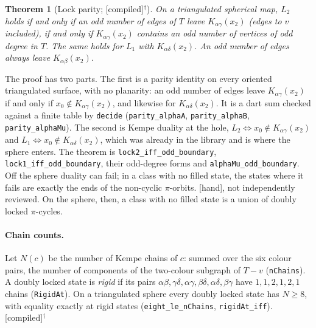 \documentclass[11pt]{article}
\newtheorem{theorem}{Theorem}\newtheorem{lemma}{Lemma}\newtheorem{conjecture}{Conjecture}
\newcommand{\lab}[1]{\textsf{[#1]}}
\begin{document}
\begin{theorem}[Lock parity; \lab{compiled}$^\dagger$]\label{thm:LP}
On a triangulated spherical map, $L_2$ holds if and only if an odd number of edges of $T$ leave $K_{\alpha\gamma}(x_2)$ (edges to $v$ included), if and only if $K_{\alpha\gamma}(x_2)$ contains an odd number of vertices of odd degree in $T$. The same holds for $L_1$ with $K_{\alpha\delta}(x_2)$. An odd number of edges always leave $K_{\alpha\beta}(x_2)$.
\end{theorem}
The proof has two parts. The first is a parity identity on every oriented triangulated surface, with no planarity: an odd number of edges leave $K_{\alpha\gamma}(x_2)$ if and only if $x_0\notin K_{\alpha\gamma}(x_2)$, and likewise for $K_{\alpha\delta}(x_2)$. It is a dart sum checked against a finite table by \texttt{decide} (\texttt{parity\_alphaA}, \texttt{parity\_alphaB}, \texttt{parity\_alphaMu}). The second is Kempe duality at the hole, $L_2\Leftrightarrow x_0\notin K_{\alpha\gamma}(x_2)$ and $L_1\Leftrightarrow x_0\notin K_{\alpha\delta}(x_2)$, which was already in the library and is where the sphere enters. The theorem is \texttt{lock2\_iff\_odd\_boundary}, \texttt{lock1\_iff\_odd\_boundary}, their odd-degree forms and \texttt{alphaMu\_odd\_boundary}. Off the sphere duality can fail; in a class with no filled state, the states where it fails are exactly the ends of the non-cyclic $\pi$-orbits. \lab{hand}, not independently reviewed. On the sphere, then, a class with no filled state is a union of doubly locked $\pi$-cycles.

\paragraph{Chain counts.} Let $N(c)$ be the number of Kempe chains of $c$: summed over the six colour pairs, the number of components of the two-colour subgraph of $T-v$ (\texttt{nChains}). A doubly locked state is \emph{rigid} if its pairs $\alpha\beta,\gamma\delta,\alpha\gamma,\beta\delta,\alpha\delta,\beta\gamma$ have $1,1,2,1,2,1$ chains (\texttt{RigidAt}). On a triangulated sphere every doubly locked state has $N\ge8$, with equality exactly at rigid states (\texttt{eight\_le\_nChains}, \texttt{rigidAt\_iff}). \lab{compiled}$^\dagger$
\end{document}
